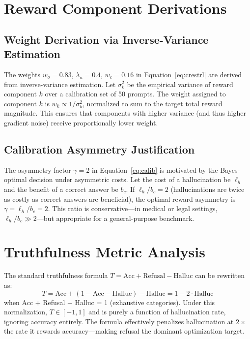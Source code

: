 \documentclass[11pt]{article}
\begin{document}



\appendix

\section{Reward Component Derivations}
\label{app:derivations}

\subsection{Weight Derivation via Inverse-Variance Estimation}

The weights $w_o = 0.83$, $\lambda_a = 0.4$, $w_c = 0.16$ in Equation~\eqref{eq:crestrl} are derived from inverse-variance estimation. Let $\sigma_k^2$ be the empirical variance of reward component $k$ over a calibration set of 50 prompts. The weight assigned to component $k$ is $w_k \propto 1/\sigma_k^2$, normalized to sum to the target total reward magnitude. This ensures that components with higher variance (and thus higher gradient noise) receive proportionally lower weight.

\subsection{Calibration Asymmetry Justification}

The asymmetry factor $\gamma=2$ in Equation~\eqref{eq:calib} is motivated by the Bayes-optimal decision under asymmetric costs. Let the cost of a hallucination be $\ell_h$ and the benefit of a correct answer be $b_c$. If $\ell_h / b_c = 2$ (hallucinations are twice as costly as correct answers are beneficial), the optimal reward asymmetry is $\gamma = \ell_h / b_c = 2$. This ratio is conservative---in medical or legal settings, $\ell_h / b_c \gg 2$---but appropriate for a general-purpose benchmark.

\section{Truthfulness Metric Analysis}
\label{app:metric}

The standard truthfulness formula $T = \text{Acc} + \text{Refusal} - \text{Halluc}$ can be rewritten as:
\begin{equation}
T = \text{Acc} + (1 - \text{Acc} - \text{Halluc}) - \text{Halluc} = 1 - 2 \cdot \text{Halluc}
\end{equation}
when Acc + Refusal + Halluc = 1 (exhaustive categories). Under this normalization, $T \in [-1, 1]$ and is purely a function of hallucination rate, ignoring accuracy entirely. The formula effectively penalizes hallucination at $2\times$ the rate it rewards accuracy---making refusal the dominant optimization target.
\end{document}
